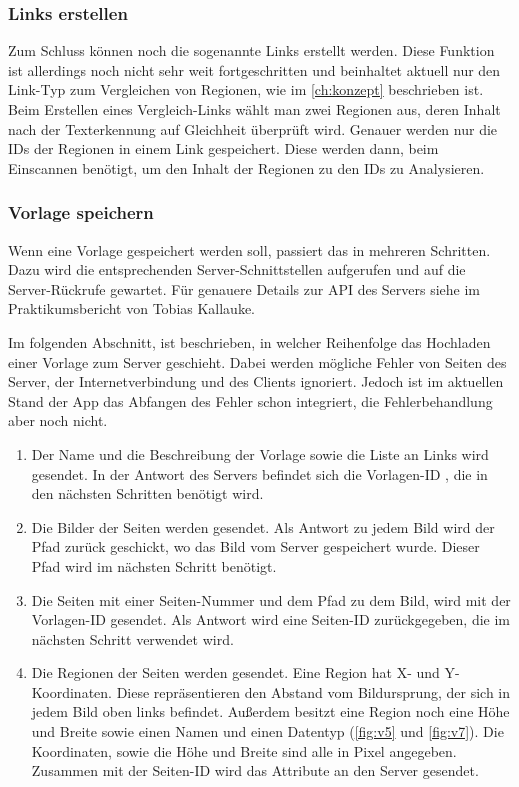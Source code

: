 \documentclass[notables, nomenclature, oneside, 150]{HSMW-Thesis}
\begin{document}
			\subsubsection*{Links erstellen}
			Zum Schluss können noch die sogenannte Links erstellt werden. Diese Funktion ist allerdings noch nicht sehr weit fortgeschritten und beinhaltet aktuell nur den Link-Typ zum Vergleichen von Regionen, wie im \autoref{ch:konzept} beschrieben ist. Beim Erstellen eines Vergleich-Links wählt man zwei Regionen aus, deren Inhalt nach der Texterkennung auf Gleichheit überprüft wird. Genauer werden nur die IDs der Regionen in einem Link gespeichert. Diese werden dann, beim Einscannen benötigt, um den Inhalt der Regionen zu den IDs zu Analysieren. 
			\subsubsection*{Vorlage speichern}
			Wenn eine Vorlage gespeichert werden soll, passiert das in mehreren Schritten. Dazu wird die entsprechenden Server-Schnittstellen aufgerufen und auf die Server-Rückrufe gewartet. Für genauere Details zur API des Servers siehe im Praktikumsbericht von Tobias Kallauke.
			
			Im folgenden Abschnitt, ist beschrieben, in welcher Reihenfolge das Hochladen einer Vorlage zum Server geschieht. Dabei werden mögliche Fehler von Seiten des Server, der Internetverbindung und des Clients ignoriert. Jedoch ist im aktuellen Stand der App das Abfangen des Fehler schon integriert, die Fehlerbehandlung aber noch nicht.
			\begin{enumerate}
				\item Der Name und die Beschreibung der Vorlage sowie die Liste an Links wird gesendet. In der Antwort des Servers befindet sich  die Vorlagen-ID , die in den nächsten Schritten benötigt wird. 
				\item Die Bilder der Seiten werden gesendet. Als Antwort zu jedem Bild wird der Pfad zurück geschickt, wo das Bild vom Server gespeichert wurde. Dieser Pfad wird im nächsten Schritt benötigt.
				\item Die Seiten mit einer Seiten-Nummer und dem Pfad zu dem Bild, wird mit der Vorlagen-ID gesendet. Als Antwort wird eine Seiten-ID zurückgegeben, die im nächsten Schritt verwendet wird.
				\item Die Regionen der Seiten werden gesendet. Eine Region hat X- und Y-Koordinaten. Diese repräsentieren den Abstand vom Bildursprung, der sich in jedem Bild oben links befindet. Außerdem besitzt eine Region noch eine Höhe und Breite sowie einen Namen und einen Datentyp (\ref{fig:v5} und \ref{fig:v7}). Die Koordinaten, sowie die Höhe und Breite sind alle in Pixel angegeben. Zusammen mit der Seiten-ID wird das Attribute an den Server gesendet.
			\end{enumerate}
			
\end{document}
